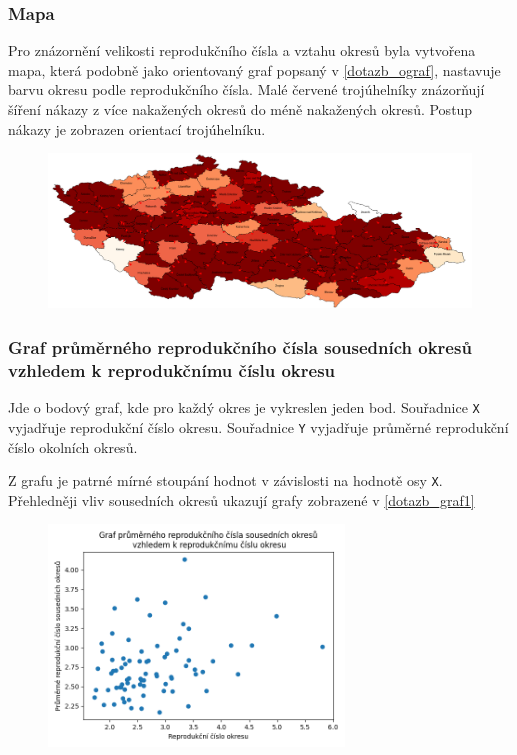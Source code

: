 \documentclass[11pt,a4paper,titlepage]{article}
\begin{document}
\subsubsection{Mapa}\label{dotazb_mapa}
Pro znázornění velikosti reprodukčního čísla a vztahu okresů byla vytvořena mapa, která podobně jako orientovaný graf popsaný v \ref{dotazb_ograf}, nastavuje barvu okresu podle reprodukčního čísla. Malé červené trojúhelníky znázorňují šíření nákazy z více nakažených okresů do méně nakažených okresů. Postup nákazy je zobrazen orientací trojúhelníku.

\begin{figure}[h]
    \centering
    \includegraphics[width=\textwidth]{img/mapa.png}
    \label{fig:external_country}
\end{figure}
\newpage
\subsubsection{Graf průměrného reprodukčního čísla sousedních okresů vzhledem k reprodukčnímu číslu okresu}
Jde o bodový graf, kde pro každý okres je vykreslen jeden bod. Souřadnice \texttt{X} vyjadřuje reprodukční číslo okresu. Souřadnice \texttt{Y} vyjadřuje průměrné reprodukční číslo okolních okresů.

Z grafu je patrné mírné stoupání hodnot v závislosti na hodnotě osy \texttt{X}. Přehledněji vliv sousedních okresů ukazují grafy zobrazené v \ref{dotazb_graf1}
\begin{figure}[h]
    \centering
    \includegraphics[width=0.70\textwidth]{img/graf_okresy02.png}
    \label{fig:external_country}
\end{figure}
\end{document}
